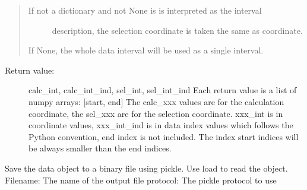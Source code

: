 \documentclass[letterpaper,10pt,english]{sphinxmanual}
\begin{document}
\begin{fulllineitems}
\begin{fulllineitems}
\begin{quote}
\begin{description}
\begin{description}
\item[{If not a dictionary and not None is is interpreted as the interval}] \leavevmode
description, the selection coordinate is taken the same as
coordinate.

\end{description}

If None, the whole data interval will be used as a single interval.

\end{description}
\end{quote}
\begin{description}
\item[{Return value:}] \leavevmode
calc\_int, calc\_int\_ind, sel\_int, sel\_int\_ind
Each return value is a list of numpy arrays: {[}start, end{]}
The calc\_xxx values are for the calculation coordinate, the sel\_xxx are for the
selection coordinate. xxx\_int is in coordinate values, xxx\_int\_ind is in data index
values which follows the Python convention, end index is not included.
The index start indices will be always smaller than the end indices.

\end{description}

\end{fulllineitems}


\begin{fulllineitems}
\label{\detokenize{data_object:flap.data_object.DataObject.save}}
Save the data object to a binary file using pickle.
Use load to read the object.
Filename: The name of the output file
protocol: The pickle protocol to use

\end{fulllineitems}



\end{fulllineitems}
\end{document}
